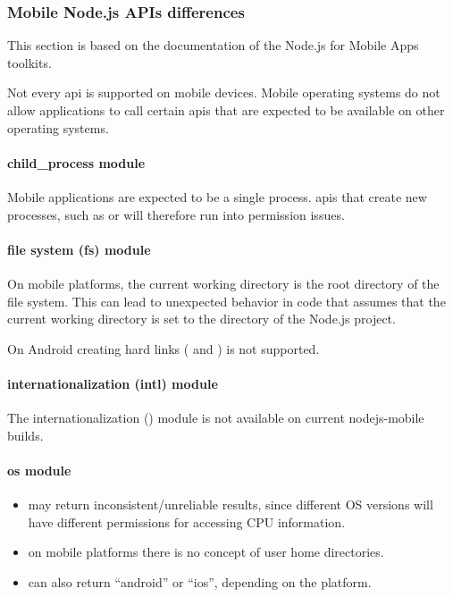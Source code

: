 \subsubsection{Mobile Node.js APIs differences}
\label{sec:Capacitor-NodeJS:MobileAPIDifferences}

\begin{note}[Note]
  This section is based on the documentation of the Node.js for Mobile Apps toolkits.
  \cite{nodejs-mobile:docs}
\end{note}

Not every \ac{api} is supported on mobile devices.
Mobile operating systems do not allow applications to call certain \acsp{api} that are expected to be available on other operating systems.

\paragraph{child\_process module}

Mobile applications are expected to be a single process.
\acsp{api} that create new processes, such as  or  will therefore run into permission issues.

\paragraph{file system (fs) module}

On mobile platforms, the current working directory is the root directory of the file system.
This can lead to unexpected behavior in code that assumes that the current working directory is set to the directory of the Node.js project.

On Android creating hard links ( and ) is not supported.

\paragraph{internationalization (intl) module}

The internationalization () module is not available on current nodejs-mobile builds.

\paragraph{os module}

\begin{itemize}
  \setlength\itemsep{-0.5em}
  \item {} may return inconsistent/unreliable results, since different OS versions will have different permissions for accessing CPU information.
  \item {} on mobile platforms there is no concept of user home directories.
  \item {} can also return \enquote{android} or \enquote{ios}, depending on the platform.
\end{itemize}

